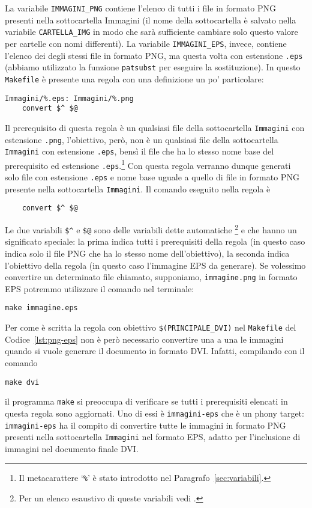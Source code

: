 La variabile \verb|IMMAGINI_PNG| contiene l'elenco di tutti i file in formato
\textsc{PNG} presenti nella sottocartella Immagini (il nome della sottocartella
è salvato nella variabile \verb|CARTELLA_IMG| in modo che sarà sufficiente
cambiare solo questo valore per cartelle con nomi differenti).  La variabile
\verb|IMMAGINI_EPS|, invece, contiene l'elenco dei degli stessi file in formato
\textsc{PNG}, ma questa volta con estensione \verb|.eps| (abbiamo utilizzato la
funzione \verb|patsubst| per eseguire la sostituzione).  In questo
\verb|Makefile| è presente una regola con una definizione un po' particolare:
\begin{lstlisting}
Immagini/%.eps: Immagini/%.png
	convert $^ $@
\end{lstlisting}
Il prerequisito di questa regola è un qualsiasi file della sottocartella
\verb|Immagini| con estensione \verb|.png|, l'obiettivo, però, non è un
qualsiasi file della sottocartella \verb|Immagini| con estensione \verb|.eps|,
bensì il file che ha lo stesso nome base del prerequisito ed estensione
\verb|.eps|.\footnote{Il metacarattere `\texttt{\%}' è stato introdotto nel
  Paragrafo~\ref{sec:variabili}.}
Con questa regola verranno dunque generati solo file con estensione \verb|.eps|
e nome base uguale a quello di file in formato \textsc{PNG} presente nella
sottocartella \verb|Immagini|.  Il comando eseguito nella regola è
\begin{lstlisting}
	convert $^ $@
\end{lstlisting}
Le due variabili \verb|$^| e \verb|$@| sono delle variabili dette automatiche%
\footnote{Per un elenco esaustivo di queste variabili vedi
  \textcite[112]{gnu:make}.}
e che hanno un significato speciale: la prima indica tutti i prerequisiti della
regola (in questo caso indica solo il file \textsc{PNG} che ha lo stesso nome
dell'obiettivo), la seconda indica l'obiettivo della regola (in questo caso
l'immagine \textsc{EPS} da generare).  Se volessimo convertire un determinato
file chiamato, supponiamo, \verb|immagine.png| in formato \textsc{EPS} potremmo
utilizzare il comando nel terminale:
\begin{verbatim}
make immagine.eps
\end{verbatim}
Per come è scritta la regola con obiettivo \verb|$(PRINCIPALE_DVI)|
nel \verb|Makefile| del Codice~\ref{lst:png-eps} non è però necessario
convertire una a una le immagini quando si vuole generare il documento in
formato \textsc{DVI}.  Infatti, compilando con il comando
\begin{verbatim}
make dvi
\end{verbatim}
il programma \verb|make| si preoccupa di verificare se tutti i prerequisiti
elencati in questa regola sono aggiornati.  Uno di essi è \verb|immagini-eps|
che è un phony target: \verb|immagini-eps| ha il compito di convertire tutte le
immagini in formato \textsc{PNG} presenti nella sottocartella \verb|Immagini|
nel formato \textsc{EPS}, adatto per l'inclusione di immagini nel documento
finale \textsc{DVI}.

